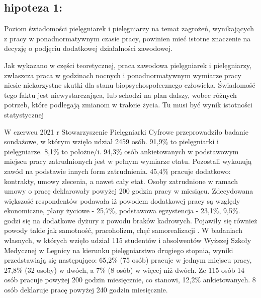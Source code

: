 \documentclass[a4paper,12pt,twoside,openright]{mwrep}
\begin{document}
\subsection*{hipoteza 1:} 
Poziom świadomości pielęgniarek i pielęgniarzy na temat zagrożeń, wynikających z pracy w ponadnormatywnym czasie pracy, powinien mieć istotne znaczenie na decyzję o podjęciu dodatkowej działalności zawodowej. 

Jak wykazano w części teoretycznej, praca zawodowa pielęgniarek i pielęgniarzy, zwłaszcza praca w godzinach nocnych i ponadnormatywnym wymiarze pracy niesie niekorzystne skutki dla stanu biopsychospołecznego człowieka. Świadomość tego faktu jest niewystarczająca, lub schodzi na plan dalszy, wobec różnych potrzeb, które podlegają zmianom w trakcie życia. Tu musi być wynik istotności statystycznej

W czerwcu 2021 r Stowarzyszenie Pielęgniarki Cyfrowe przeprowadziło badanie sondażowe, w którym wzięło udział 2459 osób. 91,9\% to pielęgniarki i pielęgniarze. 8,1\% to położne/i.  94,3\%   osób ankietowanych w podstawowym miejscu pracy zatrudnionych jest w pełnym wymiarze etatu. Pozostali wykonują zawód na podstawie innych form zatrudnienia. 45,4\%  pracuje dodatkowo: kontrakty, umowy zlecenia, a nawet cały etat. Osoby zatrudnione w ramach umowy o pracę deklarowały powyżej 200 godzin pracy w miesiącu. Zdecydowana większość respondentów podawała iż powodem dodatkowej pracy są względy ekonomiczne, plany życiowe - 25,7\%,  podstawowa egzystencja -  23,1\%, 9,5\%. godzi się na dodatkowe dyżury z powodu braków kadrowych. Pojawiły się również powody takie jak samotność, pracoholizm, chęć samorealizacji \cite{cyfrowe}. W badaniach własnych, w których wzięło udział 115 studentów i absolwentów Wyższej Szkoły Medycznej  w Legnicy na kierunku pielęgniarstwo drugiego stopnia, wyniki  przedstawiają się następująco: 65,2\% (75 osób) pracuje w jednym miejscu pracy, 27,8\%  (32 osoby) w dwóch, a 7\%  (8 osób) w więcej niż dwóch.  Ze 115 osób 14 osób pracuje powyżej 200 godzin miesięcznie, co stanowi, 12,2\% ankietowanych. 8 osób deklaruje pracę powyżej  240 godzin miesięcznie.
\end{document}
